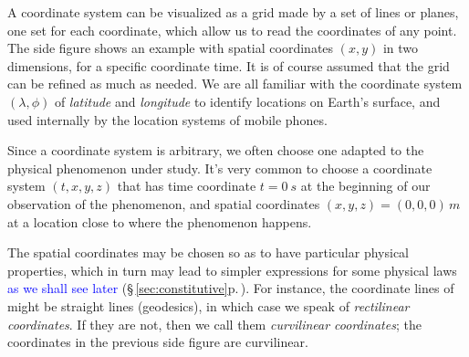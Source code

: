 \documentclass[a4paper,12pt,%
onecolumn,oneside,%
british%
]{memoir}
\renewcommand*{\|}[1][]{\nonscript\:#1\vert\nonscript\:\mathopen{}}
\newcommand*{\sect}{\S}%
\renewcommand*{\autoref}[3][\sect\,\ref]{\textcolor{blue}{#3} {\color{blue}\scriptsize(\faIcon[regular]{eye}\;#1{#2}\;p.\,\pageref{#2})}}
\begin{document}
%
%
A coordinate system can be visualized as a grid made by a set of lines or planes, one set for each coordinate, which allow us to read the coordinates of any point. The side figure shows an example with spatial coordinates $(x,y)$ in two dimensions, for a specific coordinate time. It is of course assumed that the grid can be refined as much as needed. We are all familiar with the coordinate system $(\lambda, \phi)$ of \emph{latitude} and \emph{longitude} to identify locations on Earth's surface, and used internally by the location systems of mobile phones.

Since a coordinate system is arbitrary, we often choose one adapted to the physical phenomenon under study. It's very common to choose a coordinate system $(t,x,y,z)$ that has time coordinate $t=\qty{0}{s}$ at the beginning of our observation of the phenomenon, and spatial coordinates $(x,y,z)=(0,0,0)\,\unit{m}$ at a location close to where the phenomenon happens.

\medskip

The spatial coordinates may be chosen so as to have particular physical properties, which in turn may lead to simpler expressions for some physical laws \autoref{sec:constitutive}{as we shall see later}. For instance, the coordinate lines of might be straight lines (geodesics), in which case we speak of \emph{rectilinear coordinates}. If they are not, then we call them \emph{curvilinear coordinates}; the coordinates in the previous side figure are curvilinear.
\end{document}
